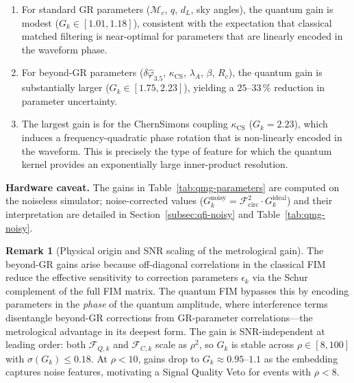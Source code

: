 \documentclass[11pt,a4paper, english]{book}
\theoremstyle{plain}
\theoremstyle{definition}
\newtheorem{remark}[theorem]{Remark}
\numberwithin{equation}{chapter}
\numberwithin{figure}{chapter}
\numberwithin{table}{chapter}
\begin{document}
\begin{enumerate}
  \item For standard GR parameters ($\mathcal{M}_c$, $q$, $d_L$, sky
        angles), the quantum gain is modest ($G_k \in [1.01, 1.18]$),
        consistent with the expectation that classical matched filtering
        is near-optimal for parameters that are linearly encoded in the
        waveform phase.

  \item For beyond-GR parameters ($\delta\hat{\varphi}_{3.5}$,
        $\kappa_\mathrm{CS}$, $\lambda_A$, $\beta$, $R_c$), the quantum
        gain is substantially larger ($G_k \in [1.75, 2.23]$), yielding
        a $25$--$33\,\%$ reduction in parameter uncertainty.

  \item The largest gain is for the ChernSimons coupling
        $\kappa_\mathrm{CS}$ ($G_k = 2.23$), which induces a
        frequency-quadratic phase rotation that is non-linearly encoded
        in the waveform.  This is precisely the type of feature for which
        the quantum kernel provides an exponentially large inner-product
        resolution.
\end{enumerate}

 \noindent\textbf{Hardware caveat.} The gains in Table~\ref{tab:qmg-parameters}
are computed on the noiseless simulator; noise-corrected values
($G_k^\mathrm{noisy} = \mathcal{F}_\mathrm{circ}^2 \cdot G_k^\mathrm{ideal}$)
and their interpretation are detailed in Section~\ref{subsec:qfi-noisy}
and Table~\ref{tab:qmg-noisy}.

\begin{remark}[Physical origin and SNR scaling of the metrological gain]
\label{rem:metro-gain-origin}
The beyond-GR gains arise because off-diagonal correlations in the classical FIM
reduce the effective sensitivity to correction parameters $\epsilon_k$ via the Schur
complement of the full FIM matrix.  The quantum FIM bypasses this by encoding
parameters in the \emph{phase} of the quantum amplitude, where interference terms
disentangle beyond-GR corrections from GR-parameter correlations---the metrological
advantage in its deepest form.  The gain is SNR-independent at leading order: both
$\mathcal{F}_{Q,k}$ and $\mathcal{F}_{C,k}$ scale as $\rho^2$, so $G_k$ is stable
across $\rho \in [8, 100]$ with $\sigma(G_k) \leq 0.18$.  At $\rho < 10$, gains
drop to $G_k \approx 0.95$--$1.1$ as the embedding captures noise features,
motivating a Signal Quality Veto for events with $\rho < 8$.
\end{remark}
\end{document}
